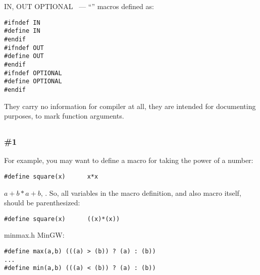 IN, OUT \AndENRU OPTIONAL ~---  ``'' 
{macros defined as}:

\begin{lstlisting}
#ifndef IN
#define IN
#endif
#ifndef OUT
#define OUT
#endif
#ifndef OPTIONAL
#define OPTIONAL
#endif
\end{lstlisting}

{They carry no information for compiler at all, they are intended for documenting purposes,
to mark function arguments}.

\subsection{}

\subsubsection{\#1}

{For example, you may want to define a macro for taking the power of a number}:

\begin{lstlisting}
#define square(x)      x*x
\end{lstlisting}

  
 $a+b*a+b$, 
.
{So, all variables in the macro definition, and also macro itself, should be parenthesized}:

\begin{lstlisting}
#define square(x)      ((x)*(x))
\end{lstlisting}

 minmax.h  MinGW:

\begin{lstlisting}
#define max(a,b) (((a) > (b)) ? (a) : (b))
...
#define min(a,b) (((a) < (b)) ? (a) : (b))
\end{lstlisting}

